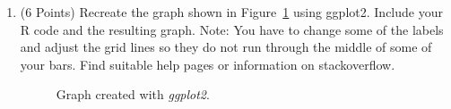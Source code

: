 \documentclass[12pt,letterpaper,final]{article}
\begin{document}
\begin{enumerate}
\begin{enumerate}
\newpage


\item (6 Points) Recreate the graph shown in Figure~\ref{hw01_q2b} using ggplot2.
Include your R code and the resulting graph. Note: You have to
change some of the labels and adjust the grid lines so they do not 
run through the middle of some of your bars. Find suitable help pages or
information on stackoverflow.



\begin{figure}[ht]
\caption{\label{hw01_q2b}
Graph created with {\it ggplot2}.
}
\end{figure}


\end{enumerate}

\end{enumerate}


\newpage


~\\
\end{document}
